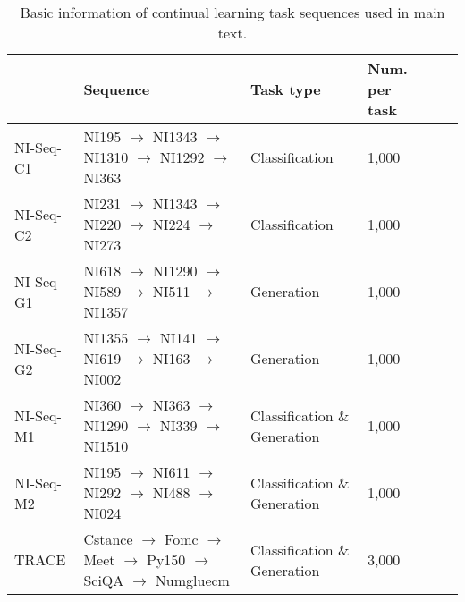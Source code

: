 \begin{table*}[]
\begin{center}
\begin{tiny}
\begin{tabular}{l|lllll}
\toprule
 & Sequence & Task type & Num. per task  \\ \midrule
NI-Seq-C1 & NI195 $\rightarrow$ NI1343 $\rightarrow$ NI1310 $\rightarrow$ NI1292 $\rightarrow$ NI363 & Classification & 1,000    \\
NI-Seq-C2 & NI231 $\rightarrow$ NI1343 $\rightarrow$ NI220 $\rightarrow$ NI224 $\rightarrow$ NI273 & Classification & 1,000    \\
NI-Seq-G1 & NI618 $\rightarrow$ NI1290 $\rightarrow$ NI589 $\rightarrow$ NI511 $\rightarrow$ NI1357 & Generation & 1,000    \\
NI-Seq-G2 & NI1355 $\rightarrow$ NI141 $\rightarrow$ NI619 $\rightarrow$ NI163 $\rightarrow$ NI002 & Generation & 1,000    \\
NI-Seq-M1 & NI360 $\rightarrow$ NI363 $\rightarrow$ NI1290 $\rightarrow$ NI339 $\rightarrow$ NI1510 & Classification \& Generation  & 1,000   \\
NI-Seq-M2 & NI195 $\rightarrow$ NI611 $\rightarrow$ NI292 $\rightarrow$ NI488 $\rightarrow$ NI024 & Classification \& Generation  & 1,000    \\
TRACE &  Cstance $\rightarrow$ Fomc $\rightarrow$ Meet $\rightarrow$ Py150 $\rightarrow$ SciQA $\rightarrow$ Numgluecm & Classification \& Generation & 3,000 \\ \bottomrule
\end{tabular}
\caption{Basic information of continual learning task sequences used in main text.}
\label{tab:sec3:data}
\vspace{-0.7em}
\end{tiny}
\end{center}

\end{table*}


